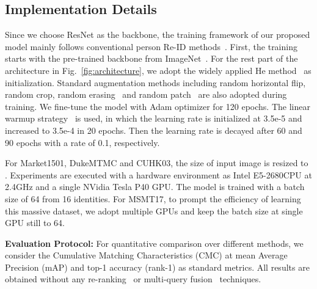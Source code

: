 \documentclass[journal]{IEEEtran}
\begin{document}
\subsection{Implementation Details}
Since we choose ResNet as the backbone, the training framework of our proposed model mainly follows conventional person Re-ID methods~\cite{zheng2016person,sun2018beyond}.
First, the training starts with the pre-trained backbone from ImageNet~\cite{he2016deep}.
For the rest part of the architecture in Fig.~\ref{fig:architecture}, we adopt the widely applied He method~\cite{7410480} as initialization.
Standard augmentation methods including random horizontal flip, random crop, random erasing~\cite{zhong2020random} and random patch~\cite{9011001} are also adopted during training.
We fine-tune the model with Adam optimizer for 120 epochs.
The linear warmup strategy~\cite{luo2019bag} is used, in which the learning rate is initialized at 3.5e-5 and increased to 3.5e-4 in 20 epochs.
Then the learning rate is decayed after 60 and 90 epochs with a rate of 0.1, respectively.

For Market1501, DukeMTMC and CUHK03, the size of input image is resized to .
Experiments are executed with a hardware environment as Intel E5-2680CPU at 2.4GHz and a single NVidia Tesla P40 GPU.
The model is trained with a batch size of 64 from 16 identities.
For MSMT17, to prompt the efficiency of learning this massive dataset, we adopt multiple GPUs and keep the batch size at single GPU still to 64.

\textbf{Evaluation Protocol:} For quantitative comparison over different methods, we consider the Cumulative Matching Characteristics (CMC) at mean Average
Precision (mAP) and top-1 accuracy (rank-1) as standard metrics.
All results are obtained without any re-ranking~\cite{zhong2017re} or multi-query fusion~\cite{bai2017reid} techniques.
\end{document}

